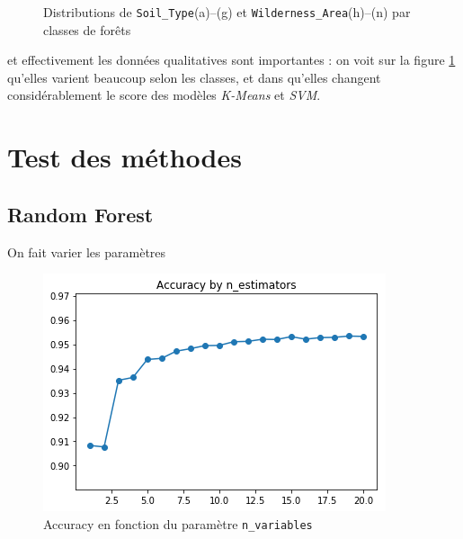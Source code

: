 \documentclass[12pt,a4paper]{article}
\numberwithin{equation}{section}
\newcommand{\wilderness}{\texttt{Wilderness\_Area}}
\newcommand{\soil}{\texttt{Soil\_Type}}
\begin{document}
\begin{figure}[h]
		\medskip
		
		\caption{Distributions de \soil (a)--(g) et \wilderness (h)--(n) par classes de forêts}
		\label{fig:soil-wild_hist}
	\end{figure}
	
	et effectivement les données qualitatives sont importantes : on voit sur la figure \ref{fig:soil-wild_hist} qu'elles varient beaucoup selon les classes, et dans \cite{C-D} qu'elles changent considérablement le score des modèles \textit{K-Means} et \textit{SVM}.
	
	\newpage
	
	\section{Test des méthodes}
	
	\subsection{Random Forest}
	
	On fait varier les paramètres
	
	\begin{figure}
		\centering
		\includegraphics[width=0.7\linewidth]{img/random_forest_accuracy1}
		\caption{Accuracy en fonction du paramètre \texttt{n\_variables} }
		\label{fig:randomforestaccuracy1}
	\end{figure}
	
	
	
	
	
	
	
\end{document}
